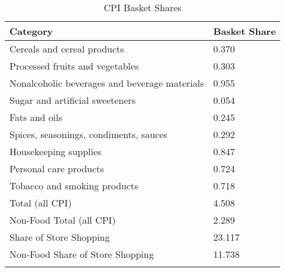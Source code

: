 \begin{table}[] \centering
  \caption{CPI Basket Shares}
  \label{tab:cpi}
\begin{tabular}{ll}
\textbf{Category}                               & \textbf{Basket Share} \\
\hline
Cereals and cereal products                     & 0.370        \\
Processed fruits and vegetables                 & 0.303        \\
Nonalcoholic beverages and beverage materials   & 0.955        \\
Sugar and artificial sweeteners                 & 0.054         \\
Fats and oils                                   & 0.245 \\
Spices, seasonings, condiments, sauces          & 0.292 \\
Housekeeping supplies                           & 0.847 \\
Personal care products                          & 0.724 \\
Tobacco and smoking products                    & 0.718 \\
\hline
Total (all CPI)                                 & 4.508 \\
Non-Food Total (all CPI)                        & 2.289 \\
\hline
Share of Store Shopping                         & 23.117 \\
Non-Food Share of Store Shopping                & 11.738 \\
&
  \end{tabular}
\end{table}
